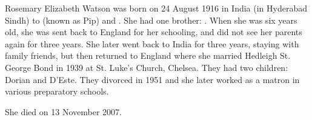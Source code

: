 
Rosemary Elizabeth Watson was born on 24 August 1916 in India (in Hyderabad Sindh) to  (known as Pip) and .
She had one brother: .
When she was six years old, she was sent back to England for her schooling, and did not see her parents again for three years. She later went back to India for three years, staying with family friends, but then returned to England where she married Hedleigh St. George Bond in 1939 at St. Luke's Church, Chelsea. They had two children: Dorian and D'Este. They divorced in 1951 and she later worked as a matron in various preparatory schools.

She died on 13 November 2007.
